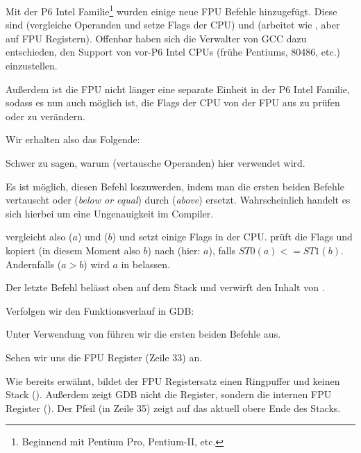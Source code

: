 \label{gcc481_o3}
Mit der P6 Intel Familie\footnote{Beginnend mit Pentium Pro, Pentium-II, etc.}
wurden einige neue FPU Befehle hinzugefügt. 
Diese sind  (vergleiche Operanden und setze Flags der CPU) und 
 (arbeitet wie , aber auf FPU Registern).
Offenbar haben sich die Verwalter von GCC dazu entschieden, den Support von
vor-P6 Intel CPUs (frühe Pentiums, 80486, etc.) einzustellen.

Außerdem ist die FPU nicht länger eine separate Einheit in der P6 Intel Familie,
sodass es nun auch möglich ist, die Flags der CPU von der FPU aus zu prüfen oder
zu verändern.

Wir erhalten also das Folgende:



Schwer zu sagen, warum  (vertausche Operanden) hier verwendet wird.

Es ist möglich, diesen Befehl loszuwerden, indem man die ersten beiden \FLD
Befehle vertauscht oder  (\emph{below or equal}) durch 
(\emph{above}) ersetzt.
Wahrscheinlich handelt es sich hierbei um eine Ungenauigkeit im Compiler.

 vergleicht also  ($a$) und  ($b$) und setzt einige
Flags in der CPU. 
 prüft die Flags und kopiert  (in diesem Moment also $b$)
nach  (hier: $a$), falls $ST0 (a) <= ST1 (b)$.
Andernfalls ($a>b$) wird $a$ in  belassen.

Der letzte \FSTP Befehl belässt  oben auf dem Stack und verwirft den
Inhalt von . 

Verfolgen wir den Funktionsverlauf in GDB:



Unter Verwendung von  führen wir die ersten beiden \FLD Befehle aus.

Sehen wir uns die FPU Register (Zeile 33) an.

Wie bereits erwähnt, bildet der FPU Registersatz einen Ringpuffer und keinen
Stack ().
Außerdem zeigt GDB nicht die  Register, sondern die internen FPU
Register (). 
Der Pfeil (in Zeile 35) zeigt auf das aktuell obere Ende des Stacks.

